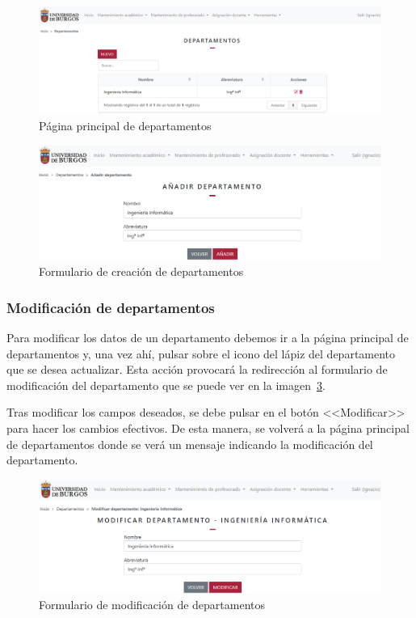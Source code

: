 \begin{figure}
	\centering
	\includegraphics[width=\textwidth]{../img/Anexos/Manual usuario/departamentos.png}
	\caption{Página principal de departamentos}\label{pag:departamentos}
\end{figure}

\begin{figure}
	\centering
	\includegraphics[width=\textwidth]{../img/Anexos/Manual usuario/formDepartamento.png}
	\caption{Formulario de creación de departamentos}\label{pag:formDepartamento}
\end{figure}

\subsubsection{Modificación de departamentos}
Para modificar los datos de un departamento debemos ir a la página principal de departamentos y, una vez ahí, pulsar sobre el icono del lápiz del departamento que se desea actualizar.
Esta acción provocará la redirección al formulario de modificación del departamento que se puede ver en la imagen~\ref{pag:formModDepartamento}.

Tras modificar los campos deseados, se debe pulsar en el botón <<Modificar>> para hacer los cambios efectivos.
De esta manera, se volverá a la página principal de departamentos donde se verá un mensaje indicando la modificación del departamento.

\begin{figure}
	\centering
	\includegraphics[width=\textwidth]{../img/Anexos/Manual usuario/formModDepartamento.png}
	\caption{Formulario de modificación de departamentos}\label{pag:formModDepartamento}
\end{figure}


